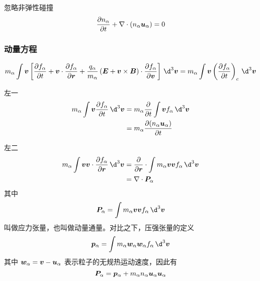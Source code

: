 忽略非弹性碰撞
\begin{equation}\label{eq:Fluid_连续性方程}
    \frac{\partial {n_\alpha}}{\partial {t}} + \nabla \cdot {(n_\alpha \bm{u}_\alpha)} = 0
\end{equation}

\subsubsection{动量方程}

\begin{equation}
    m_\alpha \int \vector{v} \left[
        \pDeriv{f_\alpha}{t} + \vector{v} \cdot \pDeriv{f_\alpha}{\vector{r}} + \frac{q_\alpha}{m_\alpha} \left( \vector{E} + \vector{v} \times \vector{B} \right) \cdot \pDeriv{f_\alpha}{\vector{v}}
    \right] \, \d^3 \vector{v}
    = m_\alpha \int \vector{v} \left( \pDeriv{f_\alpha}{t} \right)_c \, \d^3 \vector{v}
\end{equation}

左一
\begin{equation}\begin{aligned}
    m_\alpha \int \vector{v} \pDeriv{f_\alpha}{t} \, \d^3 \vector{v}
    &= m_\alpha \pDeriv{}{t} \int \vector{v} f_\alpha \, \d^3 \vector{v} \\
    &= m_\alpha \pDeriv{\left( n_\alpha \vector{u}_\alpha \right)}{t}
\end{aligned}\end{equation}

左二
\begin{equation}\begin{aligned}
    m_\alpha \int \vector{v} \vector{v} \cdot \pDeriv{f_\alpha}{\vector{r}} \, \d^3 \vector{v}
    &= \pDeriv{}{\vector{r}} \cdot \int m_\alpha \vector{v} \vector{v} f_\alpha \, \d^3 \vector{v} \\
    &= \dive{\vector{P}_\alpha}
\end{aligned}\end{equation}
其中
\begin{equation}
    \vector{P}_\alpha = \int m_\alpha \vector{v} \vector{v} f_\alpha \, \d^3 \vector{v}
\end{equation}
叫做应力张量，也叫做动量通量。对比之下，压强张量的定义
\begin{equation}
    \vector{p}_\alpha = \int m_\alpha \vector{w}_\alpha \vector{w}_\alpha f_\alpha \, \d^3 \vector{v}
\end{equation}
其中 $\bm{w}_\alpha = \bm{v} - \bm{u}_\alpha$ 表示粒子的无规热运动速度，因此有
\begin{equation}
    \bm{P}_\alpha = \bm{p}_\alpha + m_\alpha n_\alpha \bm{u}_\alpha \bm{u}_\alpha
\end{equation}

